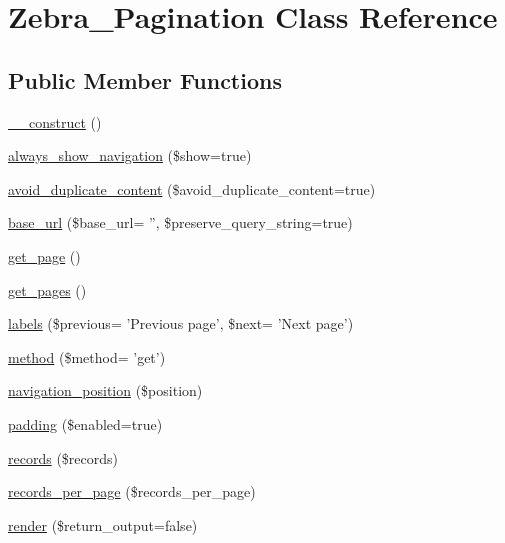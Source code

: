 \hypertarget{class_zebra___pagination}{\section{Zebra\-\_\-\-Pagination Class Reference}
\label{class_zebra___pagination}
}
\subsection*{Public Member Functions}
\begin{DoxyCompactItemize}
\item 
\hyperlink{class_zebra___pagination_a095c5d389db211932136b53f25f39685}{\-\_\-\-\_\-construct} ()
\item 
\hyperlink{class_zebra___pagination_a3b3cf621dab4a4e6f00ddb5dcaef1af9}{always\-\_\-show\-\_\-navigation} (\$show=true)
\item 
\hyperlink{class_zebra___pagination_adb7cd4f670151333a244c5690d5f0d23}{avoid\-\_\-duplicate\-\_\-content} (\$avoid\-\_\-duplicate\-\_\-content=true)
\item 
\hyperlink{class_zebra___pagination_a003c98f1ba5115a987e5c9dc2459f653}{base\-\_\-url} (\$base\-\_\-url= '', \$preserve\-\_\-query\-\_\-string=true)
\item 
\hyperlink{class_zebra___pagination_a423dbb0b90b8237501d1cd7f521cd67b}{get\-\_\-page} ()
\item 
\hyperlink{class_zebra___pagination_a460eab97d7f45178ec01bff9f3472d29}{get\-\_\-pages} ()
\item 
\hyperlink{class_zebra___pagination_aa3e239a76fb291708d38413af2eafc1b}{labels} (\$previous= 'Previous page', \$next= 'Next page')
\item 
\hyperlink{class_zebra___pagination_a93a61d5a2937ad62c9aeb3ccfc61692f}{method} (\$method= 'get')
\item 
\hyperlink{class_zebra___pagination_ab20862d0884572d8c6d2f832d811b455}{navigation\-\_\-position} (\$position)
\item 
\hyperlink{class_zebra___pagination_a0a308692b68e9639dda6715a1edcd06f}{padding} (\$enabled=true)
\item 
\hyperlink{class_zebra___pagination_adf76b0634438239971561df892dacca6}{records} (\$records)
\item 
\hyperlink{class_zebra___pagination_a9e6acc2e7fb8311fbf8d14cc229f2a24}{records\-\_\-per\-\_\-page} (\$records\-\_\-per\-\_\-page)
\item 
\hyperlink{class_zebra___pagination_a61d392ba1582c75e718e44c6c03cfc16}{render} (\$return\-\_\-output=false)

\end{DoxyCompactItemize}
